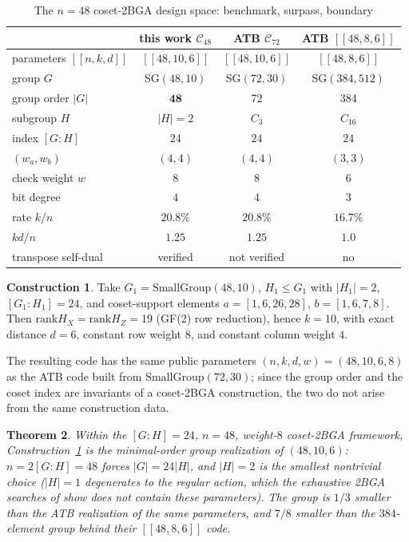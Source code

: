 \documentclass[journal,onecolumn]{IEEEtran}
\newtheorem{theorem}{Theorem}
\theoremstyle{definition}
\newtheorem{construction}[theorem]{Construction}
\theoremstyle{remark}
\newcommand{\rank}{\mathrm{rank}}
\begin{document}
\begin{table}[t]
\centering
\caption{The $n=48$ coset-2BGA design space: benchmark, surpass, boundary}
\label{tab:48codes}
\renewcommand{\arraystretch}{1.2}
\begin{tabular}{@{}lccc@{}}
\toprule
 & this work $\mathcal C_{48}$ & ATB $\mathcal C_{72}$ & ATB $[[48,8,6]]$ \\
\midrule
parameters $[[n,k,d]]$ & $[[48,10,6]]$ & $[[48,10,6]]$ & $[[48,8,6]]$ \\
group $G$ & SG$(48,10)$ & SG$(72,30)$ & SG$(384,512)$ \\
group order $|G|$ & $\mathbf{48}$ & $72$ & $384$ \\
subgroup $H$ & $|H|=2$ & $C_3$ & $C_{16}$ \\
index $[G{:}H]$ & $24$ & $24$ & $24$ \\
$(w_a,w_b)$ & $(4,4)$ & $(4,4)$ & $(3,3)$ \\
check weight $w$ & $8$ & $8$ & $6$ \\
bit degree & $4$ & $4$ & $3$ \\
rate $k/n$ & $20.8\%$ & $20.8\%$ & $16.7\%$ \\
$kd/n$ & $1.25$ & $1.25$ & $1.0$ \\
transpose self-dual & verified & not verified & no \\
\bottomrule
\end{tabular}
\end{table}

\begin{construction}\label{cons:48}
Take $G_1=\mathrm{SmallGroup}(48,10)$, $H_1\le G_1$ with $|H_1|=2$,
$[G_1{:}H_1]=24$, and coset-support elements $a=[1,6,26,28]$,
$b=[1,6,7,8]$. Then $\rank H_X=\rank H_Z=19$ (GF(2) row reduction), hence
$k=10$, with exact distance $d=6$, constant row weight $8$, and constant
column weight $4$.
\end{construction}

The resulting code has the same public parameters
$(n,k,d,w)=(48,10,6,8)$ as the ATB code built from
$\mathrm{SmallGroup}(72,30)$; since the group order and the coset index
are invariants of a coset-2BGA construction, the two do not arise from
the same construction data.

\begin{theorem}\label{thm:minimal}
Within the $[G{:}H]=24$, $n=48$, weight-$8$ coset-2BGA framework,
Construction~\ref{cons:48} is the minimal-order group realization of
$(48,10,6)$: $n=2[G{:}H]=48$ forces $|G|=24|H|$, and $|H|=2$ is the
smallest nontrivial choice ($|H|=1$ degenerates to the regular action,
which the exhaustive 2BGA searches of \cite{ATB} show does not contain
these parameters). The group is $1/3$ smaller than the ATB realization of
the same parameters, and $7/8$ smaller than the $384$-element group
behind their $[[48,8,6]]$ code.
\end{theorem}
\end{document}

